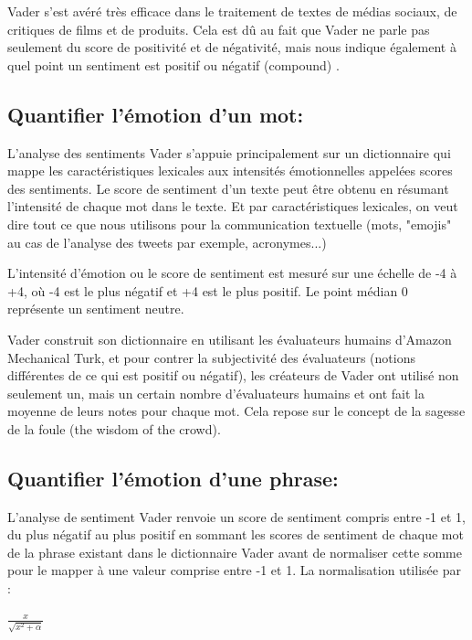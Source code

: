 Vader s'est avéré très efficace dans le traitement de textes de médias sociaux, de critiques de films et de produits. Cela est dû au fait que Vader ne parle pas seulement du score de positivité et de négativité, mais nous indique également à quel point un sentiment est positif ou négatif (compound) \cite{hutto2014Vader}.


\subsection{Quantifier l'émotion d'un mot:}
L'analyse des sentiments Vader s'appuie principalement sur un dictionnaire qui mappe les caractéristiques lexicales aux intensités émotionnelles appelées scores des sentiments. Le score de sentiment d'un texte peut être obtenu en résumant l'intensité de chaque mot dans le texte. Et par caractéristiques lexicales, on veut dire tout ce que nous utilisons pour la communication textuelle (mots, "emojis" au cas de l'analyse des tweets par exemple, acronymes...)

L'intensité d'émotion ou le score de sentiment est mesuré sur une échelle de -4 à +4, où -4 est le plus négatif et +4 est le plus positif. Le point médian 0 représente un sentiment neutre.

Vader construit son dictionnaire en utilisant les évaluateurs humains d'Amazon Mechanical Turk, et pour contrer la subjectivité des évaluateurs (notions différentes de ce qui est positif ou négatif), les créateurs de Vader ont utilisé non seulement un, mais un certain nombre d'évaluateurs humains et ont fait la moyenne de leurs notes pour chaque mot. Cela repose sur le concept de la sagesse de la foule (the wisdom of the crowd).
\subsection{Quantifier l'émotion d'une phrase:}
L'analyse de sentiment Vader renvoie un score de sentiment compris entre -1 et 1, du plus négatif au plus positif en sommant les scores de sentiment de chaque mot de la phrase existant dans le dictionnaire Vader avant de normaliser cette somme pour le mapper à une valeur comprise entre -1 et 1. La normalisation utilisée par \cite{hutto2014Vader}:
\begin{center}
    $\frac{x}{\sqrt{x^{2}+\alpha}}$
\end{center}

